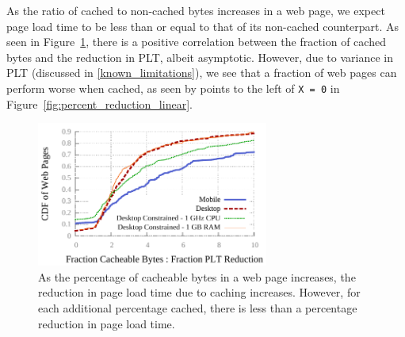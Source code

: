 As the ratio of cached to non-cached bytes increases in a web page, we expect page load time to be less than or equal to that of its non-cached counterpart. As seen in Figure~\ref{fig:ratio_linear_comparison}, there is a positive correlation between the fraction of cached bytes and the reduction in PLT, albeit asymptotic.
However, due to variance in PLT (discussed in \ref{known_limitations}), we see that a fraction of web pages can perform worse when cached, as seen by points to the left of \texttt{X = 0} in Figure~\ref{fig:percent_reduction_linear}.
\begin{figure}[t]
    \includegraphics[width=3in]{../graphs/ratio_bytes_to_reduction/ratio_linear_comparison.pdf}
    \caption[]{\label{fig:ratio_linear_comparison}As the percentage of cacheable bytes in a web page increases, the reduction in page load time due to caching increases. However, for each additional percentage cached, there is less than a percentage reduction in page load time.}
\end{figure}
